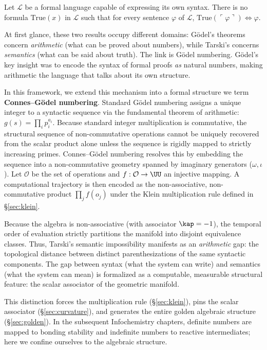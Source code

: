 \begin{theorem}\label{thm:tarski}
Let $\mathcal{L}$ be a formal language capable of expressing its own syntax. There is no formula $\mathrm{True}(x)$ in $\mathcal{L}$ such that for every sentence $\varphi$ of $\mathcal{L}$, $\mathrm{True}(\ulcorner \varphi \urcorner) \iff \varphi$.
\end{theorem}

At first glance, these two results occupy different domains: G\"odel's theorems concern \emph{arithmetic} (what can be proved about numbers), while Tarski's concerns \emph{semantics} (what can be said about truth). The link is G\"odel numbering. G\"odel's key insight was to encode the syntax of formal proofs \emph{as} natural numbers, making arithmetic the language that talks about its own structure. 

In this framework, we extend this mechanism into a formal structure we term \textbf{Connes--G\"odel numbering}. Standard G\"odel numbering assigns a unique integer to a syntactic sequence via the fundamental theorem of arithmetic: $g(s) = \prod_i p_i^{a_i}$. Because standard integer multiplication is commutative, the structural sequence of non-commutative operations cannot be uniquely recovered from the scalar product alone unless the sequence is rigidly mapped to strictly increasing primes. Connes--G\"odel numbering resolves this by embedding the sequence into a non-commutative geometry spanned by imaginary generators ($\omega, \iota$). Let $\mathcal{O}$ be the set of operations and $f: \mathcal{O} \to \UU$ an injective mapping. A computational trajectory is then encoded as the non-associative, non-commutative product $\prod_{j} f(o_j)$ under the Klein multiplication rule defined in \S\ref{sec:klein}. 

Because the algebra is non-associative (with associator $\kap = -1$), the temporal order of evaluation strictly partitions the manifold into disjoint equivalence classes. Thus, Tarski's semantic impossibility manifests as an \emph{arithmetic} gap: the topological distance between distinct parenthesizations of the same syntactic components. The gap between syntax (what the system can write) and semantics (what the system can mean) is formalized as a computable, measurable structural feature: the scalar associator of the geometric manifold.

\medskip

This distinction forces the multiplication rule (\S\ref{sec:klein}), pins the scalar associator (\S\ref{sec:curvature}), and generates the entire golden algebraic structure (\S\ref{sec:golden}). In the subsequent Infochemistry chapters, definite numbers are mapped to bonding stability and indefinite numbers to reactive intermediates; here we confine ourselves to the algebraic structure.

